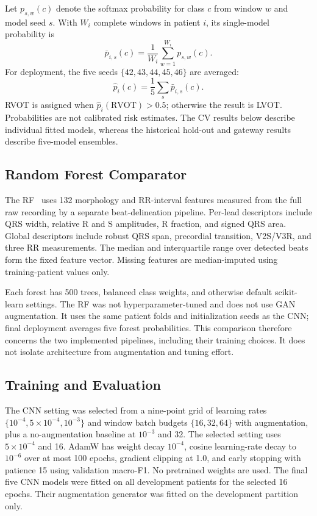 \documentclass[conference,a4paper]{IEEEtran}
\begin{document}
Let $p_{s,w}(c)$ denote the softmax probability for class $c$ from window $w$ and model seed $s$. With $W_i$ complete windows in patient $i$, its single-model probability is
\begin{equation}
\bar p_{i,s}(c)=\frac{1}{W_i}\sum_{w=1}^{W_i}p_{s,w}(c).
\label{eq:pool}
\end{equation}
For deployment, the five seeds $\{42,43,44,45,46\}$ are averaged:
\begin{equation}
\hat p_i(c)=\frac{1}{5}\sum_s\bar p_{i,s}(c).
\label{eq:ensemble}
\end{equation}
RVOT is assigned when $\hat p_i(\mathrm{RVOT})>0.5$; otherwise the result is LVOT. Probabilities are not calibrated risk estimates. The CV results below describe individual fitted models, whereas the historical hold-out and gateway results describe five-model ensembles.

\subsection{Random Forest Comparator}
The RF~\cite{breiman2001} uses 132 morphology and RR-interval features measured from the full raw recording by a separate beat-delineation pipeline. Per-lead descriptors include QRS width, relative R and S amplitudes, R fraction, and signed QRS area. Global descriptors include robust QRS span, precordial transition, V2S/V3R, and three RR measurements. The median and interquartile range over detected beats form the fixed feature vector. Missing features are median-imputed using training-patient values only.

Each forest has 500 trees, balanced class weights, and otherwise default scikit-learn settings. The RF was not hyperparameter-tuned and does not use GAN augmentation. It uses the same patient folds and initialization seeds as the CNN; final deployment averages five forest probabilities. This comparison therefore concerns the two implemented pipelines, including their training choices. It does not isolate architecture from augmentation and tuning effort.

\subsection{Training and Evaluation}
The CNN setting was selected from a nine-point grid of learning rates $\{10^{-4},5\times10^{-4},10^{-3}\}$ and window batch budgets $\{16,32,64\}$ with augmentation, plus a no-augmentation baseline at $10^{-3}$ and 32. The selected setting uses $5\times10^{-4}$ and 16. AdamW has weight decay $10^{-4}$, cosine learning-rate decay to $10^{-6}$ over at most 100 epochs, gradient clipping at 1.0, and early stopping with patience 15 using validation macro-F1. No pretrained weights are used. The final five CNN models were fitted on all development patients for the selected 16 epochs. Their augmentation generator was fitted on the development partition only.
\end{document}
